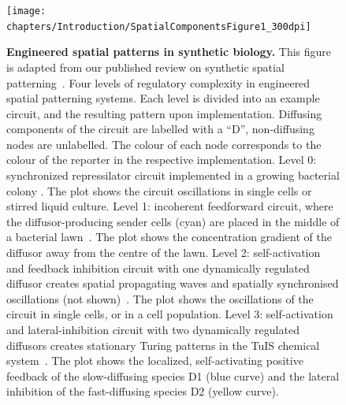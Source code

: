 \begin{figure}[H]
    \centering
    \texttt{[image: chapters/Introduction/SpatialComponentsFigure1\_300dpi]}
    \caption{\textbf{Engineered spatial patterns in synthetic biology.} This figure is adapted from our published review on synthetic spatial patterning~\parencite{huidobro}. Four levels of regulatory complexity in engineered spatial patterning systems. Each level is divided into an example circuit, and the resulting pattern upon implementation. Diffusing components of the circuit are labelled with a “D”, non-diffusing nodes are unlabelled. The colour of each node corresponds to the colour of the reporter in the respective implementation. Level 0: synchronized repressilator circuit implemented in a growing bacterial colony \parencite{Potvin-Trottier2016}. The plot shows the circuit oscillations in single cells or stirred liquid culture. Level 1: incoherent feedforward circuit, where the diffusor-producing sender cells (cyan) are placed in the middle of a bacterial lawn~\parencite{Basu2005}. The plot shows the concentration gradient of the diffusor away from the centre of the lawn. Level 2: self-activation and feedback inhibition circuit with one dynamically regulated diffusor creates spatial propagating waves and spatially synchronised oscillations (not shown)~\parencite{Danino2010}. The plot shows the oscillations of the circuit in single cells, or in a cell population. Level 3: self-activation and lateral-inhibition circuit with two dynamically regulated diffusors creates stationary Turing patterns in the TuIS chemical system~\parencite{Horvath}. The plot shows the localized, self-activating positive feedback of the slow-diffusing species D1 (blue curve) and the lateral inhibition of the fast-diffusing species D2 (yellow curve).} %
    \label{fig:engineered_patterns}
\end{figure}


